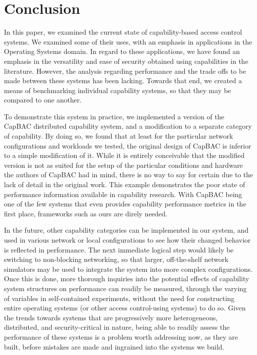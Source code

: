 \section{Conclusion}
\label{sec:conclusion}

In this paper, we examined the current state of capability-based access control systems. We examined some of their uses, with an emphasis in applications in the Operating Systems domain. In regard to these applications, we have found an emphasis in the versatility and ease of security obtained using capabilities in the literature. However, the analysis regarding performance and the trade offs to be made between these systems has been lacking. Towards that end, we created a means of benchmarking individual capability systems, so that they may be compared to one another.

To demonstrate this system in practice, we implemented a version of the CapBAC distributed capability system, and a modification to a separate category of capability. By doing so, we found that at least for the particular network configurations and workloads we tested, the original design of CapBAC is inferior to a simple modification of it. While it is entirely conceivable that the modified version is not as suited for the setup of the particular conditions and hardware the authors of CapBAC had in mind, there is no way to say for certain due to the lack of detail in the original work. This example demonstrates the poor state of performance information available in capability research. With CapBAC being one of the few systems that even provides capability performance metrics in the first place, frameworks such as ours are direly needed.

In the future, other capability categories can be implemented in our system, and used in various network or local configurations to see how their changed behavior is reflected in performance. The next immediate logical step would likely be switching to non-blocking networking, so that larger, off-the-shelf network simulators may be used to integrate the system into more complex configurations. Once this is done, more thorough inquiries into the potential effects of capability system structures on performance can readily be measured, through the varying of variables in self-contained experiments, without the need for constructing entire operating systems (or other access control-using systems) to do so. Given the trends towards systems that are progressively more heterogeneous, distributed, and security-critical in nature, being able to readily assess the performance of these systems is a problem worth addressing now, as they are built, before mistakes are made and ingrained into the systems we build.